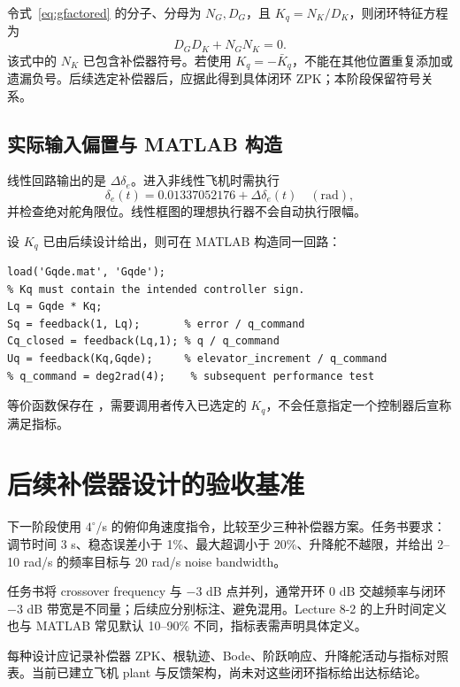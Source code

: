 \documentclass[UTF8,a4paper,11pt,fontset=windows]{ctexart}
\newcommand{\de}{\delta_e}
\newcommand{\file}[1]{\mbox{\texttt{\small\detokenize{#1}}}}
\begin{document}
令式~\eqref{eq:gfactored} 的分子、分母为 $N_G,D_G$，且 $K_q=N_K/D_K$，则闭环特征方程为
\begin{equation}
D_GD_K+N_GN_K=0.
\end{equation}
该式中的 $N_K$ 已包含补偿器符号。若使用 $K_q=-\bar K_q$，不能在其他位置重复添加或遗漏负号。后续选定补偿器后，应据此得到具体闭环 ZPK；本阶段保留符号关系。

\subsection{实际输入偏置与 MATLAB 构造}
线性回路输出的是 $\Delta\de$。进入非线性飞机时需执行
\begin{equation}
\de(t)=0.01337052176+\Delta\de(t)\quad(\mathrm{rad}),
\end{equation}
并检查绝对舵角限位。线性框图的理想执行器不会自动执行限幅。

设 $K_q$ 已由后续设计给出，则可在 MATLAB 构造同一回路：
\begin{lstlisting}
load('Gqde.mat', 'Gqde');
% Kq must contain the intended controller sign.
Lq = Gqde * Kq;
Sq = feedback(1, Lq);       % error / q_command
Cq_closed = feedback(Lq,1); % q / q_command
Uq = feedback(Kq,Gqde);     % elevator_increment / q_command
% q_command = deg2rad(4);    % subsequent performance test
\end{lstlisting}
等价函数保存在 \file{loop.m}，需要调用者传入已选定的 $K_q$，不会任意指定一个控制器后宣称满足指标。

\section{后续补偿器设计的验收基准}
下一阶段使用 $4^\circ$/s 的俯仰角速度指令，比较至少三种补偿器方案。任务书要求：调节时间 3 s、稳态误差小于 1\%、最大超调小于 20\%、升降舵不越限，并给出 2--10 rad/s 的频率目标与 20 rad/s noise bandwidth。

任务书将 crossover frequency 与 $-3$ dB 点并列，通常开环 0 dB 交越频率与闭环 $-3$ dB 带宽是不同量；后续应分别标注、避免混用。Lecture 8-2 的上升时间定义也与 MATLAB 常见默认 10--90\% 不同，指标表需声明具体定义。

每种设计应记录补偿器 ZPK、根轨迹、Bode、阶跃响应、升降舵活动与指标对照表。当前已建立飞机 plant 与反馈架构，尚未对这些闭环指标给出达标结论。
\end{document}
